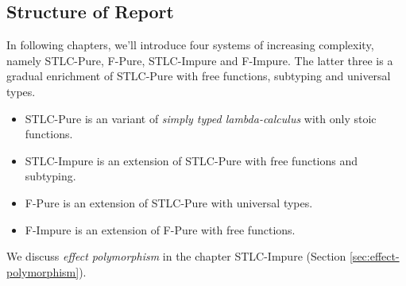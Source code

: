 \subsection{Structure of Report}

In following chapters, we'll introduce four systems of increasing
complexity, namely STLC-Pure, F-Pure, STLC-Impure and F-Impure. The
latter three is a gradual enrichment of STLC-Pure with free functions,
subtyping and universal types.

\begin{itemize}
\item STLC-Pure is an variant of \emph{simply typed lambda-calculus}
  with only stoic functions.
\item STLC-Impure is an extension of STLC-Pure with free functions and subtyping.
\item F-Pure is an extension of STLC-Pure with universal types.
\item F-Impure is an extension of F-Pure with free functions.
\end{itemize}

We discuss \emph{effect polymorphism} in the chapter STLC-Impure
(Section \ref{sec:effect-polymorphism}).
